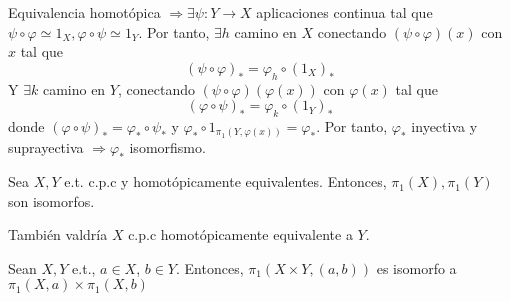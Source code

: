 \begin{dem}
  Equivalencia homotópica $\Rightarrow \exists \psi : Y \to X$ aplicaciones continua tal que $\psi \circ \varphi \simeq 1_{X}, \varphi \circ \psi \simeq 1_{Y}$. Por tanto, $\exists h$ camino en $X$ conectando $(\psi \circ \varphi)(x)$ con $x$ tal que
  \[ 
    (\psi \circ \varphi)_* = \varphi_{h} \circ (1_{X})_*
  \] 
  Y $\exists k$ camino en $Y$, conectando $(\psi \circ \varphi)(\varphi(x))$ con $\varphi(x)$ tal que
  \[ 
    (\varphi \circ \psi)_* = \varphi_{k} \circ (1_{Y})_*
  \] 
  donde $(\varphi \circ \psi)_* = \varphi_* \circ \psi_*$ y $\varphi_* \circ 1_{\pi_{1}(Y, \varphi(x))} = \varphi_*$. Por tanto, $\varphi_*$ inyectiva y suprayectiva $\Rightarrow \varphi_*$ isomorfismo.
\end{dem}

\begin{cor}
  Sea $X, Y$ e.t. c.p.c y homotópicamente equivalentes. Entonces, $\pi_{1}(X), \pi_{1}(Y)$ son isomorfos.
\end{cor}

\begin{obs}
  También valdría $X$ c.p.c homotópicamente equivalente a $Y$.
\end{obs}

\begin{prop}
  Sean $X, Y$ e.t., $a \in X$, $b \in Y$. Entonces, $\pi_{1}(X \times Y, (a, b))$ es isomorfo a $\pi_{1}(X,a) \times \pi_{1}(X, b)$
\end{prop}

